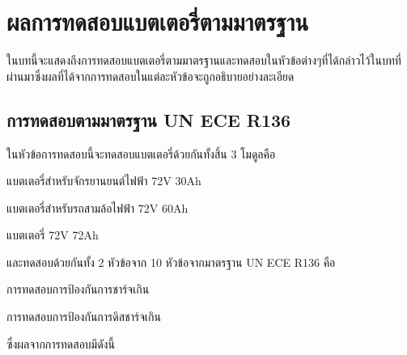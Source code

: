 \chapter{ผลการทดสอบแบตเตอรี่ตามมาตรฐาน}
ในบทนี้จะแสดงถึงการทดสอบแบตเตอรี่ตามมาตรฐานและทดสอบในหัวข้อต่างๆที่ได้กล่าวไว้ในบทที่ผ่านมาซึ่งผลที่ได้จากการทดสอบในแต่ละหัวข้อจะถูกอธิบายอย่างละเอียด
\section{การทดสอบตามมาตรฐาน UN ECE R136}
ในหัวข้อการทดสอบนี้จะทดสอบแบตเตอรี่ด้วยกันทั้งสิ้น 3 โมดูลคือ
\begin{itemize}
 {\item แบตเตอรี่สำหรับจักรยานยนต์ไฟฟ้า 72V 30Ah}
 {\item แบตเตอรี่สำหรับรถสามล้อไฟฟ้า 72V 60Ah}
 {\item แบตเตอรี่ 72V 72Ah}
\end{itemize}
และทดสอบด้วยกันทั้ง 2 หัวข้อจาก 10 หัวข้อจากมาตรฐาน UN ECE R136 คือ
\begin{itemize}
 {\item การทดสอบการป้องกันการชาร์จเกิน}
 {\item การทดสอบการป้องกันการดิสชาร์จเกิน}
\end{itemize}
ซึ่งผลจากการทดสอบมีดังนี้
\pagebreak
